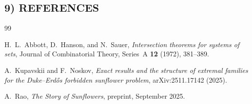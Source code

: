 \subsection{9) REFERENCES}
\begin{thebibliography}{99}

H.~L.~Abbott, D.~Hanson, and N.~Sauer,
\emph{Intersection theorems for systems of sets},
Journal of Combinatorial Theory, Series~A \textbf{12} (1972), 381--389.

A.~Kupavskii and F.~Noskov,
\emph{Exact results and the structure of extremal families for the Duke--Erd\H{o}s forbidden sunflower problem},
arXiv:2511.17142 (2025).

A.~Rao,
\emph{The Story of Sunflowers},
preprint, September 2025.

\end{thebibliography}
